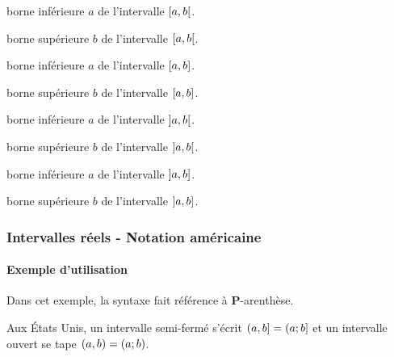 \documentclass[12pt,a4paper]{article}
\begin{document}
\bigskip





 borne inférieure $a$ de l'intervalle $\intervalCO{a}{b}$.

 borne supérieure $b$ de l'intervalle $\intervalCO{a}{b}$.


\bigskip




 borne inférieure $a$ de l'intervalle $\intervalC{a}{b}$.

 borne supérieure $b$ de l'intervalle $\intervalC{a}{b}$.


\bigskip




 borne inférieure $a$ de l'intervalle $\intervalO{a}{b}$.

 borne supérieure $b$ de l'intervalle $\intervalO{a}{b}$.


\bigskip




 borne inférieure $a$ de l'intervalle $\intervalOC{a}{b}$.

 borne supérieure $b$ de l'intervalle $\intervalOC{a}{b}$.




\subsubsection{Intervalles réels - Notation américaine}

\paragraph{Exemple d'utilisation}

Dans cet exemple, la syntaxe fait référence à \textbf{P}-arenthèse.

\begin{tcblisting}{}
Aux États Unis, un intervalle semi-fermé s'écrit $\intervalPC{a}{b} = (a ; b]$ et
un intervalle ouvert se tape $\intervalP{a}{b} = (a ; b)$.
\end{tcblisting}
\end{document}
